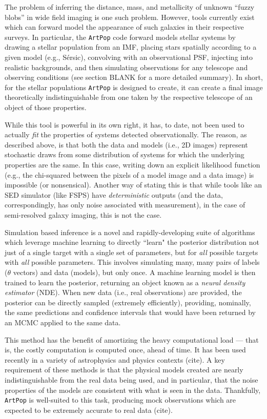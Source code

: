 \documentclass[twocolumn]{aastex631}
\newcommand{\artpop}[0]{\texttt{ArtPop}}
\begin{document}
The problem of inferring the distance, mass, and metallicity of unknown ``fuzzy blobs'' in wide field imaging is one such problem. However, tools currently exist which can forward model the appearance of such galaxies in their respective surveys. In particular, the \artpop{} code forward models stellar systems by drawing a stellar population from an IMF, placing stars spatially according to a given model (e.g., Sérsic), convolving with an observational PSF, injecting into realistic backgrounds, and then simulating observations for any telescope and observing conditions (see section BLANK for a more detailed summary). In short, for the stellar populations \artpop{} is designed to create, it can create a final image theoretically indistinguishable from one taken by the respective telescope of an object of those properties. 

While this tool is powerful in its own right, it has, to date, not been used to actually \textit{fit} the properties of systems detected observationally. The reason, as described above, is that both the data and models (i.e., 2D images) represent stochastic draws from some distribution of systems for which the underlying properties are the same. In this case, writing down an explicit likelihood function (e.g., the chi-squared between the pixels of a model image and a data image) is impossible (or nonsensical). Another way of stating this is that while tools like an SED simulator (like FSPS) have \textit{deterministic} outputs (and the data, correspondingly, has only noise associated with measurement), in the case of semi-resolved galaxy imaging, this is not the case.

Simulation based inference is a novel and rapidly-developing suite of algorithms which leverage machine learning to directly ``learn" the posterior distribution not just of a single target with a single set of parameters, but for \textit{all} possible targets with \textit{all} possible parameters. This involves simulating many, many pairs of labels ($\theta$ vectors) and data (models), but only once. A machine learning model is then trained to learn the posterior, returning an object known as a \textit{neural density estimator} (NDE). When new data (i.e., real observations) are provided, the posterior can be directly sampled (extremely efficiently), providing, nominally, the same predictions and confidence intervals that would have been returned by an MCMC applied to the same data. 

This method has the benefit of amortizing the heavy computational load --- that is, the costly computation is computed once, ahead of time. It has been used recently in a variety of astrophysics and physics contexts (cite). A key requirement of these methods is that the physical models created are nearly indistinguishable from the real data being used, and in particular, that the noise properties of the models are consistent with what is seen in the data. Thankfully, \artpop{} is well-suited to this task, producing mock observations which are expected to be extremely accurate to real data (cite). 
\end{document}
